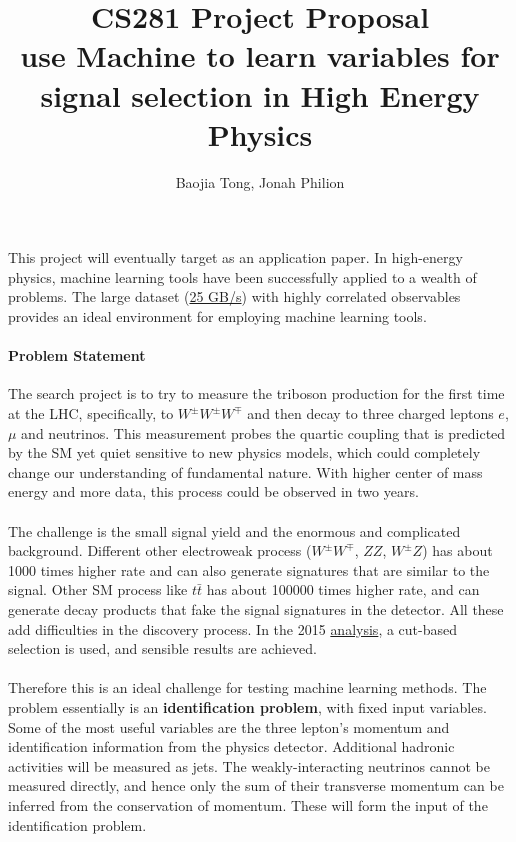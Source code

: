 \documentclass[11pt]{article}
\title{CS281 Project Proposal \\
	\large use Machine to learn variables for signal selection in High Energy Physics}
\author{Baojia Tong,  Jonah Philion}
\date{}                                           %
\begin{document}
\maketitle

\paragraph{}
This project will eventually target as an application paper. In high-energy physics, machine learning tools have been successfully applied to a wealth of problems. The large dataset (\href{https://home.cern/about/computing/processing-what-record}{25 GB/s}) with highly correlated observables provides an ideal environment for employing machine learning tools.

\paragraph{Problem Statement}
The search project is to try to measure the triboson production for the first time at the LHC, specifically, to $W^{\pm}W^{\pm}W^{\mp}$ and then decay to three charged leptons $e$, $\mu$ and neutrinos. This measurement probes the quartic coupling that is predicted by the SM yet quiet sensitive to new physics models, which could completely change our understanding of fundamental nature. With higher center of mass energy and more data, this process could be observed in two years. 

\paragraph{}
The challenge is the small signal yield and the enormous and complicated background. Different other electroweak process ($W^{\pm}W^{\mp}$, $ZZ$, $W^{\pm}Z$) has about 1000 times higher rate and can also generate signatures that are similar to the signal. Other SM process like $t\bar{t}$ has about 100000 times higher rate, and can generate decay products that fake the signal signatures in the detector. All these add difficulties in the discovery process. In the 2015 \href{https://arxiv.org/abs/1610.05088}{analysis}, a cut-based selection is used, and sensible results are achieved. 

\paragraph{}
Therefore this is an ideal challenge for testing machine learning methods. The problem essentially is an \textbf{identification problem}, with fixed input variables. Some of the most useful variables are the three lepton's momentum and identification information from the physics detector. Additional hadronic activities will be measured as jets. The weakly-interacting neutrinos cannot be measured directly, and hence only the sum of their transverse momentum can be inferred from the conservation of momentum. These will form the input of the identification problem.
\end{document}
